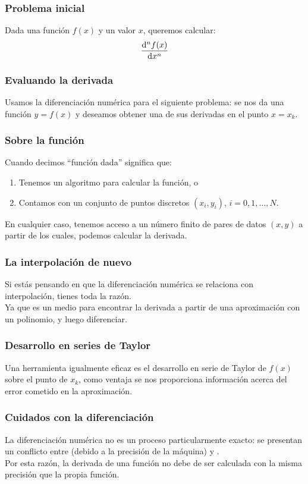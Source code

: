 \documentclass[12pt]{beamer}
\begin{document}
\begin{frame}
\frametitle{Problema inicial}
Dada una función $f (x)$ y un valor $x$, queremos calcular:
\pause
\begin{align*}
\dv[n]{f (x)}{x}
\end{align*}
\end{frame}
\begin{frame}
\frametitle{Evaluando la derivada}
Usamos la diferenciación numérica para el siguiente problema: \pause se nos da una función $y = f (x)$ y deseamos obtener una de sus derivadas en el punto $x = x_{k}$.
\end{frame}
\begin{frame}
\frametitle{Sobre la función}
Cuando decimos \enquote{función dada} significa que:
\begin{enumerate}[<+->]
\item Tenemos un algoritmo para calcular la función, o
\item Contamos con un conjunto de puntos discretos $(x_{i}, y_{i})$, $i = 0, 1,\ldots, N$.
\end{enumerate}
\pause
En cualquier caso, tenemos acceso a un número finito de pares de datos $(x, y)$ a partir de los cuales, podemos calcular la derivada.
\end{frame}
\begin{frame}
\frametitle{La interpolación de nuevo}
Si estás pensando en que la diferenciación numérica se relaciona con interpolación, tienes toda la razón.
\\
\bigskip
\pause
Ya que es un medio para encontrar la derivada a partir de una aproximación con un polinomio, y luego diferenciar.
\end{frame}
\begin{frame}
\frametitle{Desarrollo en series de Taylor}
Una herramienta igualmente eficaz es el desarrollo en serie de Taylor de $f (x)$ sobre el punto de $x_{k}$, \pause como ventaja se nos proporciona información acerca del error cometido en la aproximación.
\end{frame}
\begin{frame}
\frametitle{Cuidados con la diferenciación}
La diferenciación numérica no es un proceso particularmente exacto: \pause se presentan un conflicto entre  (debido a la precisión de la máquina) y .
\\
\bigskip
\pause
Por esta razón, la derivada de una función no debe de ser calculada con la misma precisión que la propia función.
\end{frame}
\end{document}
